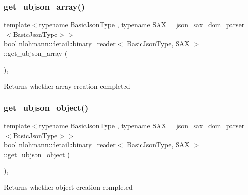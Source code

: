 \subsubsection{\texorpdfstring{get\+\_\+ubjson\+\_\+array()}{get\_ubjson\_array()}}
{\footnotesize\ttfamily template$<$typename Basic\+Json\+Type , typename S\+AX  = json\+\_\+sax\+\_\+dom\+\_\+parser$<$\+Basic\+Json\+Type$>$$>$ \\
bool \mbox{\hyperlink{classnlohmann_1_1detail_1_1binary__reader}{nlohmann\+::detail\+::binary\+\_\+reader}}$<$ Basic\+Json\+Type, S\+AX $>$\+::get\+\_\+ubjson\+\_\+array (\begin{DoxyParamCaption}{ }\end{DoxyParamCaption})\hspace{0.3cm}{\ttfamily [inline]}, {\ttfamily [private]}}

\begin{DoxyReturn}{Returns}
whether array creation completed 
\end{DoxyReturn}
\mbox{\label{classnlohmann_1_1detail_1_1binary__reader_ad0932dd568fcbbd2b4c2ccf9122544a5}} 
\subsubsection{\texorpdfstring{get\+\_\+ubjson\+\_\+object()}{get\_ubjson\_object()}}
{\footnotesize\ttfamily template$<$typename Basic\+Json\+Type , typename S\+AX  = json\+\_\+sax\+\_\+dom\+\_\+parser$<$\+Basic\+Json\+Type$>$$>$ \\
bool \mbox{\hyperlink{classnlohmann_1_1detail_1_1binary__reader}{nlohmann\+::detail\+::binary\+\_\+reader}}$<$ Basic\+Json\+Type, S\+AX $>$\+::get\+\_\+ubjson\+\_\+object (\begin{DoxyParamCaption}{ }\end{DoxyParamCaption})\hspace{0.3cm}{\ttfamily [inline]}, {\ttfamily [private]}}

\begin{DoxyReturn}{Returns}
whether object creation completed 
\end{DoxyReturn}
\mbox{\label{classnlohmann_1_1detail_1_1binary__reader_a4eae4604064b5dfe6d04e42ffc9e0753}} 
